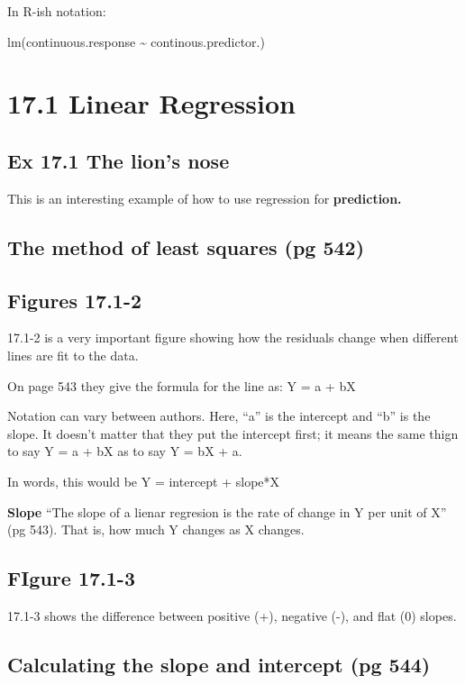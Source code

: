 \documentclass[]{book}
\theoremstyle{definition}
\theoremstyle{definition}
\theoremstyle{definition}
\theoremstyle{remark}
\begin{document}
In R-ish notation:

lm(continuous.response \textasciitilde{} continous.predictor.)

\section{17.1 Linear Regression}\label{linear-regression}

\subsection{Ex 17.1 The lion's nose}\label{ex-17.1-the-lions-nose}

This is an interesting example of how to use regression for
\textbf{prediction.}

\subsection{The method of least squares (pg
542)}\label{the-method-of-least-squares-pg-542}

\subsection{Figures 17.1-2}\label{figures-17.1-2}

17.1-2 is a very important figure showing how the residuals change when
different lines are fit to the data.

On page 543 they give the formula for the line as: Y = a + bX

Notation can vary between authors. Here, ``a'' is the intercept and
``b'' is the slope. It doesn't matter that they put the intercept first;
it means the same thign to say Y = a + bX as to say Y = bX + a.

In words, this would be Y = intercept + slope*X

\textbf{Slope} ``The slope of a lienar regresion is the rate of change
in Y per unit of X'' (pg 543). That is, how much Y changes as X changes.

\subsection{FIgure 17.1-3}\label{figure-17.1-3}

17.1-3 shows the difference between positive (+), negative (-), and flat
(0) slopes.

\subsection{Calculating the slope and intercept (pg
544)}\label{calculating-the-slope-and-intercept-pg-544}
\end{document}
